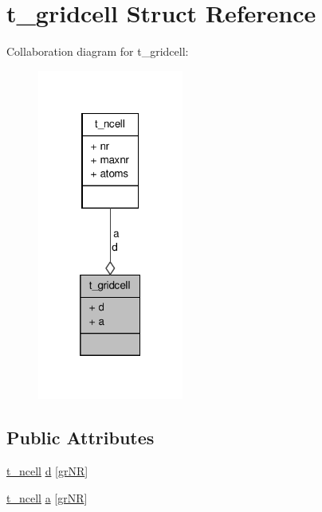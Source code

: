 \hypertarget{structt__gridcell}{\section{t\-\_\-gridcell \-Struct \-Reference}
\label{structt__gridcell}
}


\-Collaboration diagram for t\-\_\-gridcell\-:
\nopagebreak
\begin{figure}[H]
\begin{center}
\leavevmode
\includegraphics[width=136pt]{structt__gridcell__coll__graph}
\end{center}
\end{figure}
\subsection*{\-Public \-Attributes}
\begin{DoxyCompactItemize}
\item 
\hyperlink{structt__ncell}{t\-\_\-ncell} \hyperlink{structt__gridcell_aaf1f45edf6e5343c7858a7c21da446c9}{d} \mbox{[}\hyperlink{gmx__hbond_8c_ae9481b45ac17ab64ccbe9ab02225b90eaadf5c9b2d92bbe72a4a98f00ac57a13c}{gr\-N\-R}\mbox{]}
\item 
\hyperlink{structt__ncell}{t\-\_\-ncell} \hyperlink{structt__gridcell_a0a3f526a7b02a8775ecaba67cde87940}{a} \mbox{[}\hyperlink{gmx__hbond_8c_ae9481b45ac17ab64ccbe9ab02225b90eaadf5c9b2d92bbe72a4a98f00ac57a13c}{gr\-N\-R}\mbox{]}
\end{DoxyCompactItemize}


